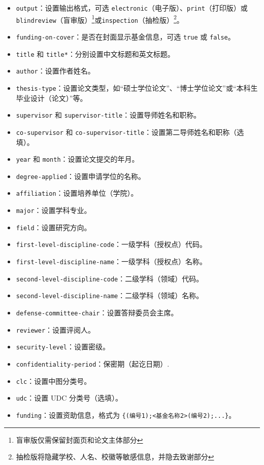 \begin{itemize}
    \item \texttt{output}：设置输出格式，可选 \texttt{electronic}（电子版）、\texttt{print}（打印版）或\texttt{blindreview}（盲审版）\footnote{盲审版仅需保留封面页和论文主体部分}或\texttt{inspection}（抽检版）\footnote{抽检版将隐藏学校、人名、校徽等敏感信息，并隐去致谢部分}。
    \item \texttt{funding-on-cover}：是否在封面显示基金信息，可选 \texttt{true} 或 \texttt{false}。
    \item \texttt{title} 和 \texttt{title*}：分别设置中文标题和英文标题。
    \item \texttt{author}：设置作者姓名。
    \item \texttt{thesis-type}：设置论文类型，如“硕士学位论文”、“博士学位论文”或“本科生毕业设计（论文）”等。
    \item \texttt{supervisor} 和 \texttt{supervisor-title}：设置导师姓名和职称。
    \item \texttt{co-supervisor} 和 \texttt{co-supervisor-title}：设置第二导师姓名和职称（选填）。
    \item \texttt{year} 和 \texttt{month}：设置论文提交的年月。
    \item \texttt{degree-applied}：设置申请学位的名称。
    \item \texttt{affiliation}：设置培养单位（学院）。
    \item \texttt{major}：设置学科专业。
    \item \texttt{field}：设置研究方向。
    \item \texttt{first-level-discipline-code}：一级学科（授权点）代码。
    \item \texttt{first-level-discipline-name}：一级学科（授权点）名称。
    \item \texttt{second-level-discipline-code}：二级学科（领域）代码。
    \item \texttt{second-level-discipline-name}：二级学科（领域）名称。
    \item \texttt{defense-committee-chair}：设置答辩委员会主席。
    \item \texttt{reviewer}：设置评阅人。
    \item \texttt{security-level}：设置密级。
    \item \texttt{confidentiality-period}：保密期（起讫日期）.
    \item \texttt{clc}：设置中图分类号。
    \item \texttt{udc}：设置 UDC 分类号（选填）。
    \item \texttt{funding}：设置资助信息，格式为 \texttt{\{<基金名称1>(编号1);<基金名称2>(编号2);...\}}。

\end{itemize}
